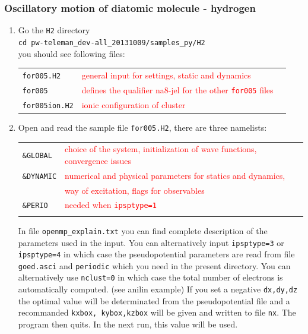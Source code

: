\documentclass[10pt]{beamer}
\begin{document}
\begin{frame}
\frametitle{Oscillatory motion of diatomic molecule - hydrogen}
\begin{enumerate}
\item Go the {\tt H2} directory\\
\vspace*{0.2cm}
{\tt cd pw-teleman\_dev-all\_20131009/samples\_py/H2}\\
\vspace*{0.2cm}
you should see following files:\\
\vspace*{0.2cm}
\begin{tabular}{lll}
{\tt for005.H2} &{\scriptsize{\textcolor{red}{general input for settings, static and dynamics}}}\\
{\tt for005}  &{\scriptsize{\textcolor{red}{defines the qualifier na8-jel for the other {\tt for005} files}}}\\
{\tt for005ion.H2} &{\scriptsize{\textcolor{red}{ionic configuration of cluster}}}\\
\end{tabular}
\vspace*{0.4cm}


\item Open and read the sample file {\tt for005.H2}, there are three namelists:\\
\vspace*{0.4cm}
\begin{tabular}{ll}
 {\tt \&GLOBAL} & {\scriptsize{\textcolor{red}{choice of the system, initialization of wave functions, convergence issues}}}\\
{\tt \&DYNAMIC}&{\scriptsize{\textcolor{red}{numerical and physical parameters for statics and dynamics, }}}\\
&{\scriptsize{\textcolor{red}{way of excitation, flags for observables}}}\\
 {\tt \&PERIO}&{\scriptsize{\textcolor{red}{needed when  {\tt ipsptype=1}}}}\\
 \vspace*{0.2cm}
\end{tabular}
In file {\tt openmp\_explain.txt} you can find complete description of the parameters used in the input. 
You can alternatively input  {\tt ipsptype=3} or  {\tt ipsptype=4} in which case the pseudopotential
parameters are read from file {\tt goed.asci} and {\tt periodic}  which you need in the present directory.
You can alternatively use  {\tt nclust=0} in which case the total number of electrons is automatically computed.
(see anilin example)
If you set a negative {\tt dx,dy,dz} the optimal value will be determinated from the pseudopotential file
and a recommanded {\tt kxbox, kybox,kzbox} will be given and written to file {\tt nx}. The program then quits. In the
next run, this value will be used.

\end{enumerate}
\end{frame}
\end{document}
